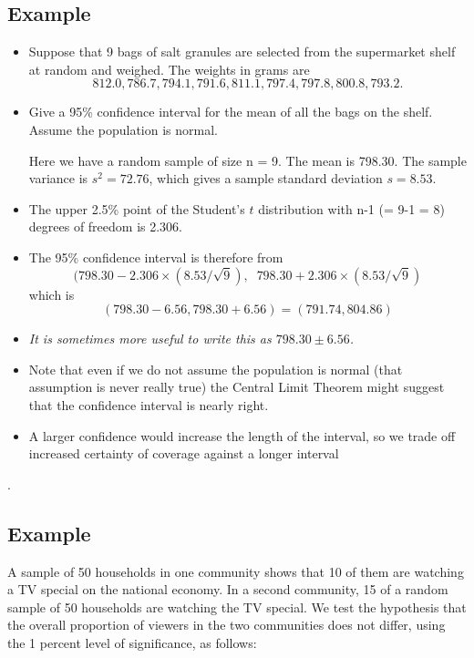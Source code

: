 \subsection{Example}
\begin{itemize}
	\item Suppose that 9 bags of salt granules are selected from the supermarket
	shelf at random and weighed. The weights in grams are \[812.0, 786.7, 794.1,
	791.6, 811.1, 797.4, 797.8, 800.8, 793.2.\] 
	\item Give a 95\% confidence interval for the
	mean of all the bags on the shelf. Assume the population is normal.
	
	
	Here we have a random sample of size n = 9. The mean is 798.30. The sample
	variance is $s^2 = 72.76$, which gives a sample standard deviation $s = 8.53$.
	
	\item The upper 2.5\% point of the Student's $t$ distribution with n-1 (= 9-1 = 8) degrees of freedom is 2.306.
	
	\item The 95\% confidence interval is therefore from 
	\[(798.30 - 2.306 \times (8.53/\sqrt{9}),\;\; 798.30 + 2.306 \times (8.53/\sqrt{9})\]
	which is\\
	\[(798.30 - 6.56, 798.30 + 6.56) = (791.74, 804.86)\]
	\item \textit{It is sometimes more useful to write this as $798.30 \pm 6.56$.}
	
	\item Note that even if we do not assume the population is normal (that assumption is
	never really true) the Central Limit Theorem might suggest that the confidence interval
	is nearly right. 
	\item A larger confidence would increase the length of the interval, so we
	trade off increased certainty of coverage against a longer interval
\end{itemize}
.


\subsection{Example} A sample of 50 households in one community
shows that 10 of them are watching a TV special on the national
economy. In a second community, 15 of a random sample of 50
households are watching the TV special. We test the hypothesis
that the overall proportion of viewers in the two communities does
not differ, using the 1 percent level of significance, as follows:




	

